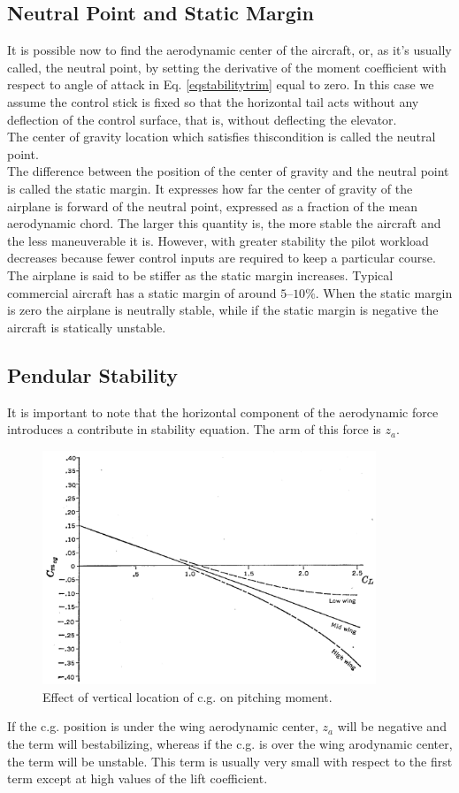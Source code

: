 \subsection{Neutral Point and Static Margin}

It is possible now to find the aerodynamic center of the aircraft, or, as it’s usually called, the neutral point, by setting the derivative of the moment coefficient with respect to angle of attack in Eq. \ref{eqstabilitytrim} equal to zero. In this case we assume the control stick is fixed so that the horizontal tail acts without any deflection of the control surface, that is, without deflecting the elevator.\\ The center of gravity location which satisfies thiscondition is called the neutral point.\\
The difference between the position of the center of gravity and the neutral point is called the static margin. It expresses how far the center of gravity of the airplane is forward of the neutral point, expressed as a fraction of the mean aerodynamic chord. The larger this quantity is, the more stable the aircraft and the less maneuverable it is. However, with greater stability the pilot workload decreases because fewer control inputs are required to keep a particular course. The airplane is said to be stiffer as the static margin increases. Typical commercial aircraft has a static margin of around $5–10\%$. When the static margin is zero the  airplane is neutrally stable, while if the static margin is negative the aircraft is statically unstable.

\subsection {Pendular Stability}

It is important to note that the horizontal component of the aerodynamic force introduces a contribute in stability equation. The arm of this force is $z_a$.\\
\begin{figure}[H]
\centering
\includegraphics[height=7cm]{Immagini/pendular}
\caption{Effect of vertical location of c.g. on pitching moment.}
\label{winperkins}
\end{figure}
If the c.g. position is under the wing aerodynamic center, $z_a$ will be negative and the term will bestabilizing, whereas if the c.g. is over the wing arodynamic center, the term will be unstable. This term is usually very small with respect to the first term except at high values of the lift coefficient. \cite{PerkinsHage}
